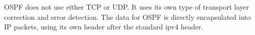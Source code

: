 OSPF does not use either TCP or UDP. It uses its own type of transport layer correction and error detection. The data for OSPF is directly encapsulated into IP packets, using its own header after the standard ipv4 header.